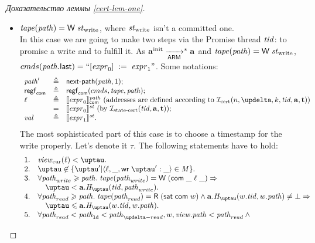 \begin{proof}[Доказательство леммы \ref{cert-lem-one}]
\begin{itemize}
    \item $\tape(\cpath) = \tapeWrite{\Wstate}$, where $\mathit{st}_{\textup{\rm write}}$ isn't a committed one. \\
      In this case we are going to make two steps via the Promise thread $\mathit{tid}$: to promise a write
      and to fulfill it.
      As $\mathbf{a}^{\rm init} \xrightarrow[\mathsf{ARM}]{}^{*} \mathbf{a}$ and $\tape(\cpath) = \tapeWrite{\Wstate}$,
      ${cmds}(\mathit{path}.\textup{\sf last}) = ``[\mathit{expr}_0]\;:=\;\mathit{expr}_1"$.
      Some notations:
      \[\begin{array}{l l l}
        \cpath'    & \triangleq & \nextPath{\cpath}{1}; \\
        \regstcom  & \triangleq & \regstcom(\Cprom, \tape, \cpath); \\
        \loc       & \triangleq &
          \semfcom{\expr_0}{\cpath} \text{ (addresses are defined according to $\invCert(n, \delta, k, \tId, \aT, \tT)$)} \\
                   & =          & \semf{\expr_0}{\PromState} \text{ (by $\invStateCERT(\tId, \aT, \tT)$)}; \\
        \stval       & \triangleq & \semf{\expr_1}{\PromState}. \\
      \end{array}\]
      The most sophisticated part of this case is to choose a timestamp for the write properly.
      Let's denote it $\tau$. The following statements have to hold:
      \[\begin{array}{l l}
        1. & \Rcur(\loc) < \tau. \\
        2. & \tau \not \in \{\tau' | \stRequestWrite{\loc}{\_}{\tau'}{\_} \in \Mprom \}. \\
        3. & \forall \cpath_{write} \ge \cpath. \; \tape(\cpath_{write}) = \tapeWrite{(\tapeWriteCommitted{\_}{\loc}{\_})} \Rightarrow \\
           &  \quad \tau < \aT.\tmap(\tId, \cpath_{write}). \\
        4. & \forall \cpath_{read} \ge \cpath. \; \tape(\cpath_{read}) = \tapeRead{(\tapeSatisfied{\Committed}{\w})} \land
                 \aT.\tmap(\w.\tId, \w.\cpath) \not = \bot \Rightarrow \\
           & \quad \tau \le \aT.\tmap(\w.\tId, \w.\cpath). \\
        5. & \forall \cpath_{read} < \cpath_{\LD} < \cpath_{\delta-read}, \w, \R. \cpath < \cpath_{read} \land {} \\

\end{array}\]
\end{itemize}
\end{proof}
